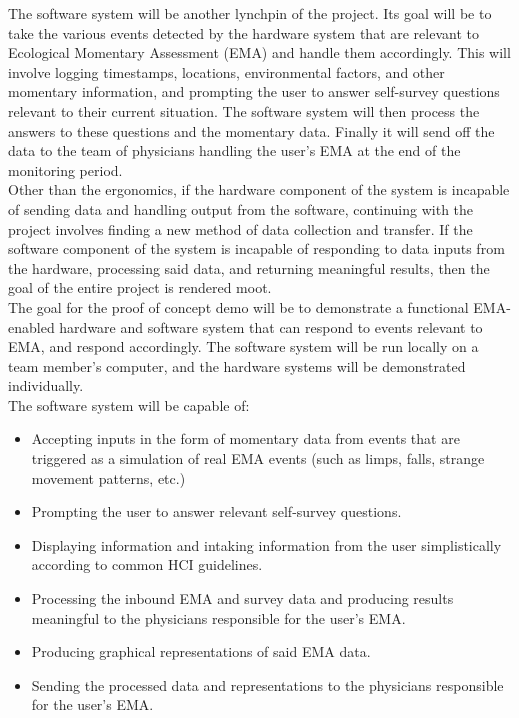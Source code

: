 \documentclass[12pt]{article}
\begin{document}
The software system will be another lynchpin of the project. Its goal will be to take the various events detected by the hardware system that are relevant to Ecological Momentary Assessment (EMA) and handle them accordingly. This will involve logging timestamps, locations, environmental factors, and other momentary information, and prompting the user to answer self-survey questions relevant to their current situation. The software system will then process the answers to these questions and the momentary data. Finally it will send off the data to the team of physicians handling the user's EMA at the end of the monitoring period.\\

Other than the ergonomics, if the hardware component of the system is incapable of sending data and handling output from the software, continuing with the project involves finding a new method of data collection and transfer. If the software component of the system is incapable of responding to data inputs from the hardware, processing said data, and returning meaningful results, then the goal of the entire project is rendered moot.\\

The goal for the proof of concept demo will be to demonstrate a functional EMA-enabled hardware and software system that can respond to events relevant to EMA, and respond accordingly. The software system will be run locally on a team member's computer, and the hardware systems will be demonstrated individually.\\

The software system will be capable of:\\

\begin{itemize}
\item Accepting inputs in the form of momentary data from events that are triggered as a simulation of real EMA events (such as limps, falls, strange movement patterns, etc.)
\item Prompting the user to answer relevant self-survey questions.
\item Displaying information and intaking information from the user simplistically according to common HCI guidelines.
\item Processing the inbound EMA and survey data and producing results meaningful to the physicians responsible for the user's EMA.
\item Producing graphical representations of said EMA data.
\item Sending the processed data and representations to the physicians responsible for the user's EMA.
\end{itemize}
\end{document}
